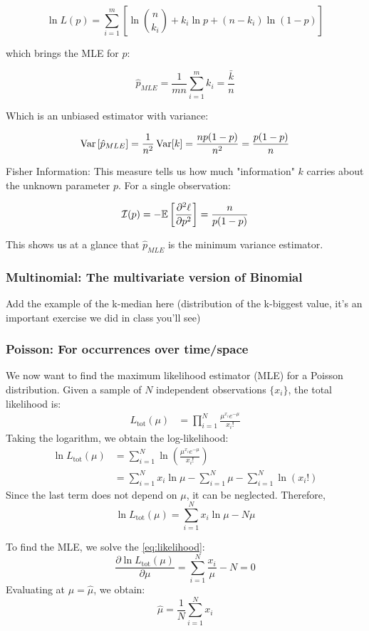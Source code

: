 	\[
	\ln L(p) = \sum_{i=1}^m \left[ \ln\binom{n}{k_i} + k_i\ln p + (n-k_i)\ln(1-p) \right]
	\]

which brings the MLE for $p$:

	\[
	\hat{p}_{MLE} = \frac{1}{mn} \sum_{i=1}^m k_i = \frac{\bar{k}}{n}
	\]

Which is an unbiased estimator with variance:

	\[
	\operatorname{Var}\left[\hat{p}_{MLE}\right] = \frac{1}{n^2}\operatorname{Var}[k] = \frac{np(1-p)}{n^2} = \frac{p(1-p)}{n}
	\]


Fisher Information: This measure tells us how much "information" $k$ carries about the unknown parameter $p$. For a single observation:

	\[
	\mathcal{I}(p) = -\mathbb{E}\left[ \frac{\partial^2 \ell}{\partial p^2} \right] = \frac{n}{p(1-p)}
	\] 

This shows us at a glance that $\hat{p}_{MLE}$ is the minimum variance estimator.

\subsubsection{Multinomial: The multivariate version of Binomial}
Add the example of the k-median here (distribution of the k-biggest value, it's an important exercise we did in class you'll see)
\subsubsection{Poisson: For occurrences over time/space}

\label{eq:poisson_mle}
We now want to find the maximum likelihood estimator (MLE) for a Poisson distribution. 
Given a sample of $N$ independent observations $\{x_i\}$, the total likelihood is:
\begin{align*}
	L_{\text{tot}}(\mu) &= \prod_{i=1}^N \frac{\mu^{x_i} e^{-\mu}}{x_i!}
\end{align*}
Taking the logarithm, we obtain the log-likelihood:
\begin{align*}
	\ln L_{\text{tot}}(\mu) 
	&= \sum_{i=1}^N \ln \left( \frac{\mu^{x_i} e^{-\mu}}{x_i!} \right) \\
	&= \sum_{i=1}^N x_i \ln \mu - \sum_{i=1}^N \mu - \sum_{i=1}^N \ln(x_i!)
\end{align*}
Since the last term does not depend on $\mu$, it can be neglected. Therefore,
\[
\ln L_{\text{tot}}(\mu) = \sum_{i=1}^N x_i \ln \mu - N\mu
\]

To find the MLE, we solve the \ref{eq:likelihood}:
\[
\frac{\partial \ln L_{\text{tot}}(\mu)}{\partial \mu} 
= \sum_{i=1}^N \frac{x_i}{\mu} - N = 0
\]
Evaluating at $\mu = \hat{\mu}$, we obtain:
\begin{equation*}
	\hat{\mu} = \frac{1}{N} \sum_{i=1}^N x_i
	\label{eq:poissonian_mle}
	\tag{Poisson MLE}
\end{equation*}

